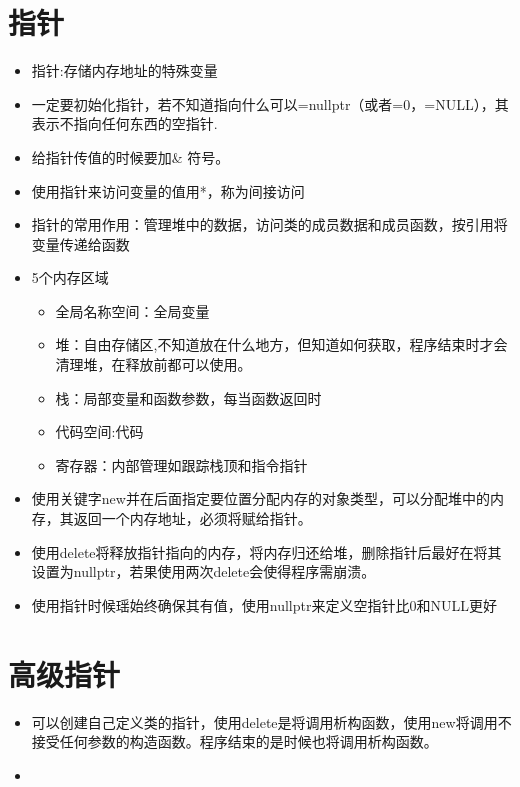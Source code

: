 \documentclass{article}
\begin{document}
\section{指针}
\begin{itemize}
\item 指针:存储内存地址的特殊变量
\item 一定要初始化指针，若不知道指向什么可以=nullptr（或者=0，=NULL），其表示不指向任何东西的空指针.
\item 给指针传值的时候要加\& 符号。
\item 使用指针来访问变量的值用*，称为间接访问  
\item 指针的常用作用：管理堆中的数据，访问类的成员数据和成员函数，按引用将变量传递给函数
\item 5个内存区域
	\begin{itemize}
	\item 全局名称空间：全局变量
	\item 堆：自由存储区,不知道放在什么地方，但知道如何获取，程序结束时才会清理堆，在释放前都可以使用。
	\item 栈：局部变量和函数参数，每当函数返回时
	\item 代码空间:代码
	\item 寄存器：内部管理如跟踪栈顶和指令指针
	\end{itemize}
\item 使用关键字new并在后面指定要位置分配内存的对象类型，可以分配堆中的内存，其返回一个内存地址，必须将赋给指针。
\item 使用delete将释放指针指向的内存，将内存归还给堆，删除指针后最好在将其设置为nullptr，若果使用两次delete会使得程序需崩溃。
\item 使用指针时候瑶始终确保其有值，使用nullptr来定义空指针比0和NULL更好
\end{itemize}

\section{高级指针}
\begin{itemize}
\item 可以创建自己定义类的指针，使用delete是将调用析构函数，使用new将调用不接受任何参数的构造函数。程序结束的是时候也将调用析构函数。
\item 
\end{itemize}
\end{document}

